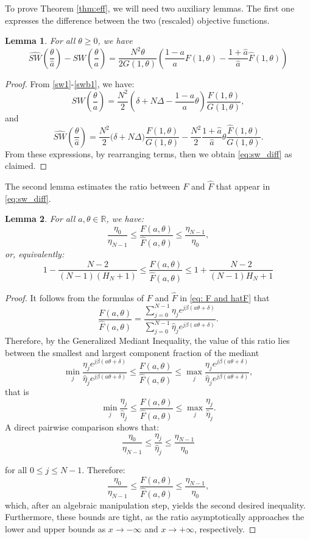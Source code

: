 \documentclass{article}
\newtheorem{lemma}{Lemma}
\begin{document}
To prove Theorem \ref{thm:eff}, we will need two auxiliary lemmas. The first one expresses the difference between the two (rescaled) objective functions.
\begin{lemma}
For all $\theta \ge 0$, we have
\begin{equation}
\widehat{SW} \left( \frac{\theta}{\hat{a}} \right) - SW \left( \frac{\theta}{a} \right) = \frac{N^2\theta}{2G(1,\theta)} \left( \frac{1-a}{a}F(1,\theta) - \frac{1+\hat{a}}{\hat{a}}\hat{F}(1,\theta) \right)
\label{eq:sw_diff}
\end{equation}
\end{lemma}
\begin{proof}
From \eqref{sw1}-\eqref{swb1}, we have:
\[
SW \left( \frac{\theta}{a} \right) = \frac{N^2}{2} \left( \delta + N\Delta - \frac{1-a}{a}\theta \right) \frac{F(1, \theta)}{G(1, \theta)},
\]
and
\[
\widehat{SW} \left( \frac{\theta}{\hat{a}} \right) = \frac{N^2}{2} \big(\delta + N\Delta)\frac{F(1, \theta)}{G(1, \theta)} - \frac{N^2}{2}\frac{1+\hat{a}}{\hat{a}}\theta\frac{\hat{F}(1, \theta)}{G(1, \theta)}.
\]
From these expressions, by rearranging terms, then we obtain \eqref{eq:sw_diff} as claimed.
\end{proof}
The second lemma estimates the ratio between $F$ and $\hat{F} $ that appear in \eqref{eq:sw_diff}.
\begin{lemma}
    For all $a, \theta \in \mathbb{R}$, we have:
\[
\frac{\eta_0}{\eta_{N-1}} \le \frac{F(a, \theta)}{\hat{F}(a, \theta)} \le \frac{\eta_{N-1}}{\eta_0},
\]
or, equivalently:
\[
1 - \frac{N-2}{(N-1)(H_N + 1)}  \le  \frac{F(a, \theta)}{\hat{F}(a, \theta)} \le 1 + \frac{N-2}{(N-1)H_N + 1}
\] \label{lem:frac_ratio}
\end{lemma}
\begin{proof}
It follows from the formulas of $F$ and $\hat F$ in \eqref{eq: F and hatF} that
\[
\frac{F(a, \theta)}{\hat{F}(a, \theta)} = \frac{\sum_{j=0}^{N-1} \eta_j e^{j\beta(a\theta +\delta)}}{\sum_{j=0}^{N-1} \hat{\eta}_j e^{j\beta(a\theta+\delta)}}.
\]
Therefore, by the Generalized Mediant Inequality, the value of this ratio lies between the smallest and largest component fraction of the mediant
\[
\min_{j} \frac{\eta_j e^{j\beta(a\theta +\delta)}}{\hat{\eta}_j e^{j\beta(a\theta+\delta)}} \le \frac{F(a, \theta)}{\hat{F}(a, \theta)} \le \max_j \frac{\eta_j e^{j\beta(a\theta +\delta)}}{\hat{\eta}_j e^{j\beta(a\theta+\delta)}},
\]
that is
\[
\min_{j}\frac{\eta_j}{\hat{\eta}_j}\leq \frac{F(a, \theta)}{\hat{F}(a, \theta)} \le \max_{j}\frac{\eta_j}{\hat{\eta}_j}.
\]
A direct pairwise comparison shows that:
\[
\frac{\eta_0}{\eta_{N-1}} \le \frac{\eta_j}{\hat{\eta}_j} \le \frac{\eta_{N-1}}{\eta_0}
\]

for all $0 \le j \le N-1$. Therefore:
\[
\frac{\eta_0}{\eta_{N-1}} \le \frac{F(a, \theta)}{\hat{F}(a, \theta)} \le \frac{\eta_{N-1}}{\eta_0},
\]
which, after an algebraic manipulation step, yields the second desired inequality. Furthermore, these bounds are tight, as the ratio asymptotically approaches the lower and upper bounds as $x \to -\infty$ and $x \to +\infty$, respectively.
\end{proof}
\end{document}

